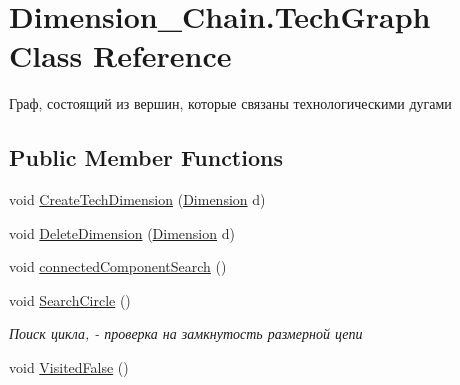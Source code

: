 \hypertarget{class_dimension___chain_1_1_tech_graph}{}\section{Dimension\+\_\+\+Chain.\+Tech\+Graph Class Reference}
\label{class_dimension___chain_1_1_tech_graph}


Граф, состоящий из вершин, которые связаны технологическими дугами  


\subsection*{Public Member Functions}
\begin{DoxyCompactItemize}
\item 
void \mbox{\hyperlink{class_dimension___chain_1_1_tech_graph_a49d45bd79eaf34122021af1118156575}{Create\+Tech\+Dimension}} (\mbox{\hyperlink{class_dimension___chain_1_1_dimension}{Dimension}} d)
\item 
void \mbox{\hyperlink{class_dimension___chain_1_1_tech_graph_a23f591d1b16a26f6f5a8b3fb19928efd}{Delete\+Dimension}} (\mbox{\hyperlink{class_dimension___chain_1_1_dimension}{Dimension}} d)
\item 
void \mbox{\hyperlink{class_dimension___chain_1_1_tech_graph_a718d1eefbf5548e20411ef4563522cd8}{connected\+Component\+Search}} ()
\item 
void \mbox{\hyperlink{class_dimension___chain_1_1_tech_graph_ac4b9d760e7b6a890bc09988a2f25c0b4}{Search\+Circle}} ()
\begin{DoxyCompactList}\small\item\em Поиск цикла, -\/ проверка на замкнутость размерной цепи \end{DoxyCompactList}\item 
void \mbox{\hyperlink{class_dimension___chain_1_1_tech_graph_a4957fc3a457f3fc25a4dd468b149f442}{Visited\+False}} ()
\end{DoxyCompactItemize}
